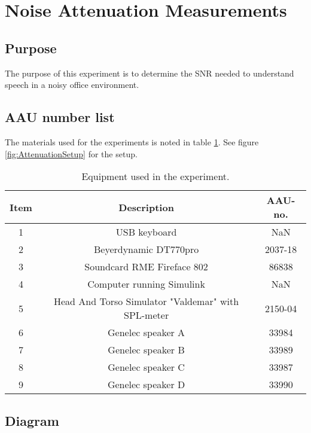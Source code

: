 \section{Noise Attenuation Measurements}

\subsection{Purpose}

The purpose of this experiment is to determine the SNR needed to understand speech in a noisy office environment. 

\subsection{AAU number list}
The materials used for the experiments is noted in table \ref{tab:UsedEquipmentListningAttenuation}. See figure \ref{fig:AttenuationSetup} for the setup.

\begin{table}[h]
	\centering
	
	\begin{tabular}{ c c c } \toprule
		{Item} & {Description} & {AAU-no}. \\ \bottomrule 
		1      	&  USB keyboard							& NaN		\\
		2      	&  Beyerdynamic DT770pro				& 2037-18	\\
		3      	&  Soundcard RME Fireface 802           & 86838		\\
		4      	&  Computer	running Simulink			& NaN		\\  
		5		&  Head And Torso Simulator "Valdemar" with SPL-meter					& 2150-04	\\
		6      	&  Genelec speaker A					& 33984		\\
		7      	&  Genelec speaker B					& 33989		\\
		8      	&  Genelec speaker C					& 33987		\\
		9      	&  Genelec speaker D					& 33990		\\ \bottomrule 
	\end{tabular}
	\caption{Equipment used in the experiment.}
	\label{tab:UsedEquipmentListningAttenuation}
\end{table}



\subsection{Diagram}

